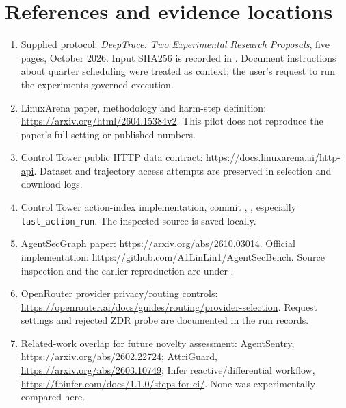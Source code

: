 \documentclass[10pt,letterpaper]{article}
\begin{document}
\section*{References and evidence locations}
\begin{enumerate}
\item Supplied protocol: \emph{DeepTrace: Two Experimental Research Proposals}, five pages, October 2026. Input SHA256 is recorded in . Document instructions about quarter scheduling were treated as context; the user's request to run the experiments governed execution.
\item LinuxArena paper, methodology and harm-step definition: \url{https://arxiv.org/html/2604.15384v2}. This pilot does not reproduce the paper's full setting or published numbers.
\item Control Tower public HTTP data contract: \url{https://docs.linuxarena.ai/http-api}. Dataset and trajectory access attempts are preserved in selection and download logs.
\item Control Tower action-index implementation, commit , , especially \texttt{last\_action\_run}. The inspected source is saved locally.
\item AgentSecGraph paper: \url{https://arxiv.org/abs/2610.03014}. Official implementation: \url{https://github.com/A1LinLin1/AgentSecBench}. Source inspection and the earlier reproduction are under .
\item OpenRouter provider privacy/routing controls: \url{https://openrouter.ai/docs/guides/routing/provider-selection}. Request settings and rejected ZDR probe are documented in the run records.
\item Related-work overlap for future novelty assessment: AgentSentry, \url{https://arxiv.org/abs/2602.22724}; AttriGuard, \url{https://arxiv.org/abs/2603.10749}; Infer reactive/differential workflow, \url{https://fbinfer.com/docs/1.1.0/steps-for-ci/}. None was experimentally compared here.
\end{enumerate}
\end{document}
